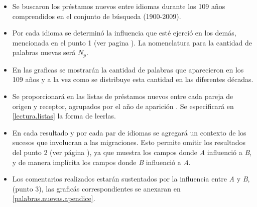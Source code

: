 \begin{itemize}

\item Se buscaron los préstamos nuevos entre idiomas durante los 109 años comprendidos en el conjunto de búsqueda (1900-2009).
	
\item Por cada idioma se determinó la influencia que esté ejerció en los demás, mencionada en el punto 1 (ver pagina \pageref{proceso.nuevos}). La nomenclatura para la cantidad de palabras nuevas será $N_{p}$.



\item En las graficas se mostrarán la cantidad de palabras que aparecieron en los 109 años y a la vez como se distribuye esta cantidad en las diferentes décadas. 

\item Se proporcionará en \cite{prestamos_nuevos} las listas  de préstamos nuevos entre cada pareja de origen y receptor, agrupados por el año de aparición .  Se especificará en \ref{lectura.listas}  la forma de leerlas.

\item En cada resultado y por cada par de idiomas se agregará un contexto  de los sucesos  que involucran a las migraciones. Esto permite omitir los resultados del punto 2 (ver  página \pageref{proceso.nuevos}), ya que muestra los campos donde \textit{A} influenció a  \textit{B}, y  de manera implícita los campos donde \textit{B} influenció a \textit{A}.

\item Los comentarios realizados estarán sustentados por la influencia entre \textit{A} y \textit{B}, (punto 3), las graficás correspondientes se anexaran en \ref{palabras.nuevas.apendice}. 

\end{itemize}



